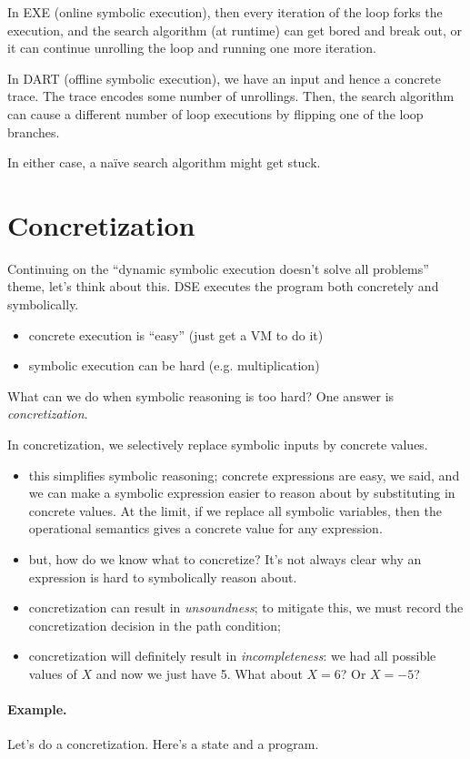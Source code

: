 \documentclass[11pt]{article}
\begin{document}
In EXE (online symbolic execution), then every iteration of the loop forks the execution, and the search algorithm (at runtime) can get bored and
break out, or it can continue unrolling the loop and running one more iteration.

In DART (offline symbolic execution), we have an input and hence a concrete trace. The trace encodes some number of unrollings. Then, the search algorithm
can cause a different number of loop executions by flipping one of the loop branches.

In either case, a na\"ive search algorithm might get stuck.

\section{Concretization}
Continuing on the ``dynamic symbolic execution doesn't solve all problems'' theme, let's think about this. DSE executes the program both concretely and symbolically.
\begin{itemize}[noitemsep]
\item concrete execution is ``easy'' (just get a VM to do it)
\item symbolic execution can be hard (e.g. multiplication)
\end{itemize}
What can we do when symbolic reasoning is too hard? One answer is \emph{concretization}.

In concretization, we selectively replace symbolic inputs by concrete values.
\begin{itemize}[noitemsep]
\item this simplifies symbolic reasoning; concrete expressions are easy, we said, and we can make a symbolic expression easier to reason about by substituting in concrete values. At the limit, if we replace all symbolic variables, then the operational semantics gives a concrete value for any expression.
\item but, how do we know what to concretize? It's not always clear why an expression is hard to symbolically reason about.
\item concretization can result in \emph{unsoundness}; to mitigate this, we must record the concretization decision in the path condition;
\item concretization will definitely result in \emph{incompleteness}: we had all possible values of $X$ and now we just have 5. What about $X = 6$? Or $X=-5$?
\end{itemize}

\paragraph{Example.} Let's do a concretization. Here's a state and a program.
\end{document}
